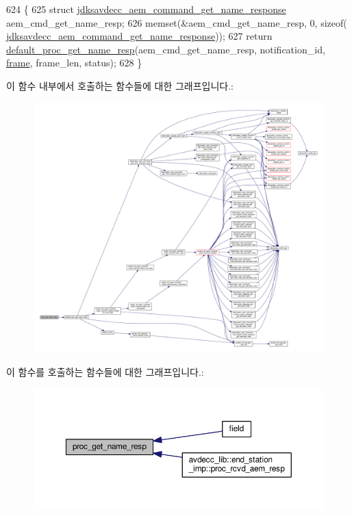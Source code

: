 \begin{DoxyCode}
624 \{
625     \textcolor{keyword}{struct }\hyperlink{structjdksavdecc__aem__command__get__name__response}{jdksavdecc\_aem\_command\_get\_name\_response} 
      aem\_cmd\_get\_name\_resp;
626     memset(&aem\_cmd\_get\_name\_resp, 0, \textcolor{keyword}{sizeof}(
      \hyperlink{structjdksavdecc__aem__command__get__name__response}{jdksavdecc\_aem\_command\_get\_name\_response}));
627     \textcolor{keywordflow}{return} \hyperlink{classavdecc__lib_1_1descriptor__base__imp_acc8b1c1591bd54bc9a2d21d4f0db2e86}{default\_proc\_get\_name\_resp}(aem\_cmd\_get\_name\_resp, notification\_id, 
      \hyperlink{gst__avb__playbin_8c_ac8e710e0b5e994c0545d75d69868c6f0}{frame}, frame\_len, status);
628 \}
\end{DoxyCode}


이 함수 내부에서 호출하는 함수들에 대한 그래프입니다.\+:
\nopagebreak
\begin{figure}[H]
\begin{center}
\leavevmode
\includegraphics[width=350pt]{classavdecc__lib_1_1descriptor__base__imp_ac4e290a88039a8e4915f7b9f8738881f_cgraph}
\end{center}
\end{figure}




이 함수를 호출하는 함수들에 대한 그래프입니다.\+:
\nopagebreak
\begin{figure}[H]
\begin{center}
\leavevmode
\includegraphics[width=350pt]{classavdecc__lib_1_1descriptor__base__imp_ac4e290a88039a8e4915f7b9f8738881f_icgraph}
\end{center}
\end{figure}


